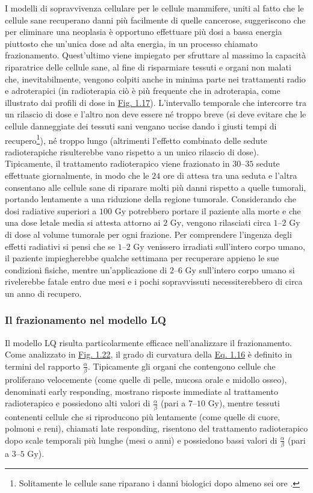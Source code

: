 \documentclass[12pt,a4paper,twoside]{report}
\begin{document}
	I modelli di sopravvivenza cellulare per le cellule mammifere, uniti al fatto che le cellule sane recuperano danni più facilmente di quelle cancerose, suggeriscono che per eliminare una neoplasia è opportuno effettuare più dosi a bassa energia piuttosto che un'unica dose ad alta energia, in un processo chiamato frazionamento. Quest'ultimo viene impiegato per sfruttare al massimo la capacità riparatrice delle cellule sane, al fine di risparmiare tessuti e organi non malati che, inevitabilmente, vengono colpiti anche in minima parte nei trattamenti radio e adroterapici (in radioterapia ciò è più frequente che in adroterapia, come illustrato dai profili di dose in \hyperref[fig:photon]{Fig. 1.17}). L'intervallo temporale che intercorre tra un rilascio di dose e l'altro non deve essere né troppo breve (si deve evitare che le cellule danneggiate dei tessuti sani vengano uccise dando i giusti tempi di recupero\footnote{Solitamente le cellule sane riparano i danni biologici dopo almeno sei ore \cite{Chang2021}.}), né troppo lungo (altrimenti l'effetto combinato delle sedute radioterapiche risulterebbe vano rispetto a un unico rilascio di dose). Tipicamente, il trattamento radioterapico viene frazionato in $30$--$35$ sedute effettuate giornalmente, in modo che le $24$ ore di attesa tra una seduta e l'altra consentano alle cellule sane di riparare molti più danni rispetto a quelle tumorali, portando lentamente a una riduzione della regione tumorale. Considerando che dosi radiative superiori a $100 \mbox{ Gy}$ potrebbero portare il paziente alla morte e che una dose letale media si attesta attorno ai $2 \mbox{ Gy}$, vengono rilasciati circa $1$--$2\mbox{ Gy}$ di dose al volume tumorale per ogni frazione. Per comprendere l'ingenza degli effetti radiativi si pensi che se $1$--$2\mbox{ Gy}$ venissero irradiati sull'intero corpo umano, il paziente impiegherebbe qualche settimana per recuperare appieno le sue condizioni fisiche, mentre un'applicazione di $2$--$6\mbox{ Gy}$ sull'intero corpo umano si rivelerebbe fatale entro due mesi e i pochi sopravvissuti necessiterebbero di circa un anno di recupero.
		
	\subsubsection{Il frazionamento nel modello LQ}
	Il modello LQ risulta particolarmente efficace nell'analizzare il frazionamento. Come analizzato in \hyperref[fig:survival_cell]{Fig. 1.22}, il grado di curvatura della \hyperref[eq:survival2]{Eq. 1.16} è definito in termini del rapporto $\frac{\alpha}{\beta}$. Tipicamente gli organi che contengono cellule che proliferano velocemente (come quelle di pelle, mucosa orale e midollo osseo), denominati early responding, mostrano risposte immediate al trattamento radioterapico e possiedono alti valori di $\frac{\alpha}{\beta}$ (pari a $7$--$10\mbox{ Gy}$), mentre tessuti contenenti cellule che si riproducono più lentamente (come quelle di cuore, polmoni e reni), chiamati late responding, risentono del trattamento radioterapico dopo scale temporali più lunghe (mesi o anni) e possiedono bassi valori di $\frac{\alpha}{\beta}$ (pari a $3$--$5\mbox{ Gy}$).
	
\end{document}
